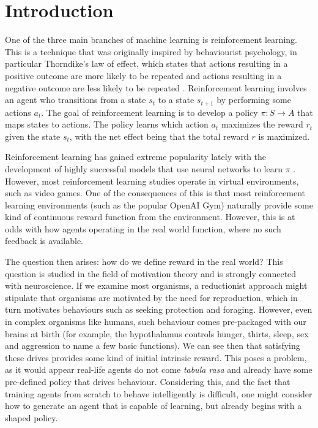 \documentclass[conference, 12pt]{IEEEtran} %
\begin{document}
	\section{Introduction}
	\par One of the three main branches of machine learning is reinforcement learning. This is a technique that was originally inspired by behaviourist psychology, in particular Thorndike's law of effect, which states that actions resulting in a positive outcome are more likely to be repeated and actions resulting in a negative outcome are less likely to be repeated \cite{lawofeffect}. Reinforcement learning involves an agent who transitions from a state $s_t$ to a state $s_{t+1}$ by performing some actions $a_t$. The goal of reinforcement learning is to develop a policy $\pi : S \to A$ that maps states to actions. The policy learns which action $a_t$ maximizes the reward $r_t$ given the state $s_t$, with the net effect being that the total reward $r$ is maximized.
	\par Reinforcement learning has gained extreme popularity lately with the development of highly successful models that use neural networks to learn $\pi$ \cite{atari}. However, most reinforcement learning studies operate in virtual environments, such as video games. One of the consequences of this is that most reinforcement learning environments (such as the popular OpenAI Gym) naturally provide some kind of continuous reward function from the environment. However, this is at odds with how agents operating in the real world function, where no such feedback is available.
	\par The question then arises: how do we define reward in the real world? This question is studied in the field of motivation theory and is strongly connected with neuroscience. If we examine most organisms, a reductionist approach might stipulate that organisms are motivated by the need for reproduction, which in turn motivates behaviours such as seeking protection and foraging. However, even in complex organisms like humans, such behaviour comes pre-packaged with our brains at birth (for example, the hypothalamus controls hunger, thirts, sleep, sex and aggression to name a few basic functions). We can see then that satisfying these drives provides some kind of initial intrinsic reward. This poses a problem, as it would appear real-life agents do not come \textit{tabula rasa} and already have some pre-defined policy that drives behaviour. Considering this, and the fact that training agents from scratch to behave intelligently is difficult, one might consider how to generate an agent that is capable of learning, but already begins with a shaped policy.
\end{document}

